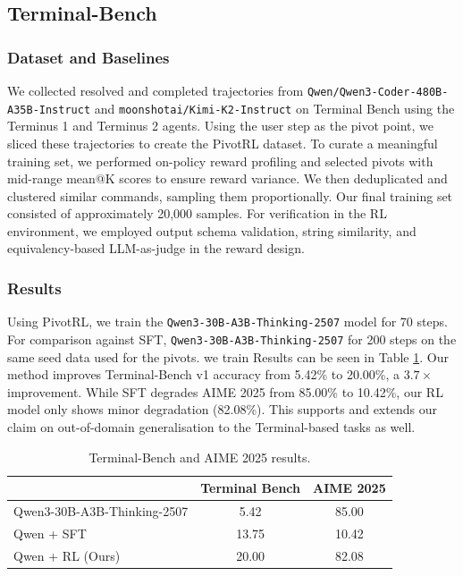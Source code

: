 \subsection{Terminal-Bench}
\subsubsection{Dataset and Baselines}
We collected resolved and completed trajectories from \texttt{Qwen/Qwen3-Coder-480B-A35B-Instruct} and \texttt{moonshotai/Kimi-K2-Instruct} on Terminal Bench using the Terminus 1 and Terminus 2 agents. Using the user step as the pivot point, we sliced these trajectories to create the PivotRL dataset. To curate a meaningful training set, we performed on-policy reward profiling and selected pivots with mid-range mean@K scores to ensure reward variance. We then deduplicated and clustered similar commands, sampling them proportionally. Our final training set consisted of approximately 20,000 samples. For verification in the RL environment, we employed output schema validation, string similarity, and equivalency-based LLM-as-judge in the reward design.


\subsubsection{Results}
Using PivotRL, we train the \texttt{Qwen3-30B-A3B-Thinking-2507} model for 70 steps. For comparison against SFT, \texttt{Qwen3-30B-A3B-Thinking-2507} for 200 steps on the same seed data used for the pivots. we train  Results can be seen in Table \ref{table:results_terminal}. Our method improves Terminal-Bench v1 accuracy from 5.42\% to 20.00\%, a $3.7\times$ improvement. While SFT degrades AIME 2025 from 85.00\% to 10.42\%, our RL model only shows minor degradation (82.08\%). This supports and extends our claim on out-of-domain generalisation to the Terminal-based tasks as well. 

\begin{table}[t]
\small
\centering
\setlength{\tabcolsep}{6pt}
\begin{tabular}{lcc}
\toprule
& \textbf{Terminal Bench} & \textbf{AIME 2025} \\
\midrule
Qwen3-30B-A3B-Thinking-2507 & 5.42 & 85.00 \\
\midrule
Qwen + SFT                  & 13.75 & 10.42 \\
Qwen + RL (Ours)            & 20.00 & 82.08 \\
\bottomrule
\end{tabular}
\caption{Terminal-Bench and AIME 2025 results.}
\label{table:results_terminal}
\end{table}


